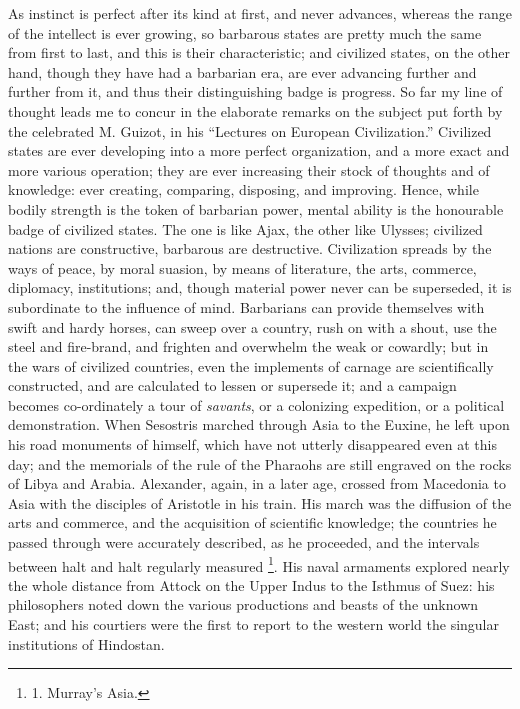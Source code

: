 As instinct is perfect after
its kind at first, and never advances, whereas the range of the
intellect is ever growing, so barbarous states are pretty much the
same from first to last, and this is their characteristic; and
civilized states, on the other hand, though they have had a barbarian
era, are ever advancing further and further from it, and thus their
distinguishing badge is progress. So far my line of thought leads me
to concur in the elaborate remarks on the subject put forth by the
celebrated M. Guizot, in his ``Lectures on European Civilization.''
Civilized states are ever developing into a more perfect
organization, and a more exact and more various operation; they are
ever increasing their stock of thoughts and of knowledge: ever
creating, comparing, disposing, and improving. Hence, while bodily
strength is the token of barbarian power, mental ability is the
honourable badge of civilized states. The one is like Ajax, the other
like Ulysses; civilized nations are constructive, barbarous are
destructive. Civilization spreads by the ways of peace, by moral
suasion, by means of literature, the arts, commerce, diplomacy,
institutions; and, though material power never can be superseded, it
is subordinate to the influence of mind. Barbarians can provide
themselves with swift and hardy horses, can sweep over a country, rush
on with a shout, use the steel and fire-brand, and frighten and
overwhelm the weak or cowardly; but in the wars of civilized
countries, even the implements of carnage are scientifically
constructed, and are calculated to lessen or supersede it; and a
campaign becomes co-ordinately a tour of \emph{savants}, or a
colonizing expedition, or a political demonstration. When Sesostris
marched through Asia to the Euxine, he left upon his road monuments of
himself, which have not utterly disappeared even at this day; and the
memorials of the rule of the Pharaohs are still engraved on the rocks
of Libya and Arabia. Alexander, again, in a later age, crossed from
Macedonia to Asia with the disciples of Aristotle in his train. His
march was the diffusion of the arts and commerce, and the acquisition
of scientific knowledge; the countries he passed through were
accurately described, as he proceeded, and the intervals between halt
and halt regularly measured \footnote{1. Murray's Asia.}.
His naval armaments explored nearly the whole distance from Attock on the Upper Indus to the Isthmus of Suez: his philosophers
noted down the various productions and beasts of the unknown East; and
his courtiers were the first to report to the western world the
singular institutions of Hindostan.

